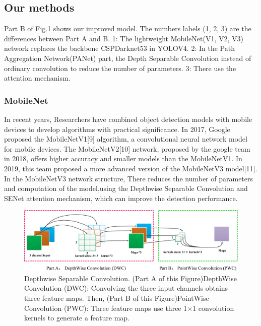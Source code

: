 \documentclass[journal]{IEEEtran}
\begin{document}
\subsection{Our methods}
Part B of Fig.1 shows our improved model. The numbers labels (1, 2,
3) are the differences between Part A and B. 1: The lightweight MobileNet(V1, V2, V3) network replaces the backbone CSPDarknet53 in YOLOV4. 2: In
the Path Aggregation Network(PANet) part, the Depth Separable Convolution instead of ordinary convolution to reduce the number of parameters. 3: There use the attention mechanism.

\subsubsection{MobileNet}
In recent years, Researchers have combined object detection models with mobile devices to develop algorithms with practical significance. In 2017, Google proposed the MobileNetV1[9] algorithm, a convolutional neural network model for mobile devices. The MobileNetV2[10] network, proposed by the google team in 2018, offers higher accuracy and smaller models than the MobileNetV1. In 2019, this team proposed a more advanced version of the MobileNetV3 model[11].
 In the MobileNetV3 network structure, There reduces the number of parameters and computation of the model,using the Depthwise Separable Convolution and SENet attention mechanism, which can improve the detection performance.
  \begin{figure}
\centerline{\includegraphics[width=0.9\columnwidth]{QiHe2.png}}
\caption{Depthwise Separable 
Convolution. (Part A of this Figure)DepthWise Convolution (DWC): Convolving the three input channels obtains three feature maps. Then, (Part B of this Figure)PointWise
Convolution (PWC): Three feature maps use three 1×1 convolution kernels to generate a feature map.}
\end{figure}
\end{document}
